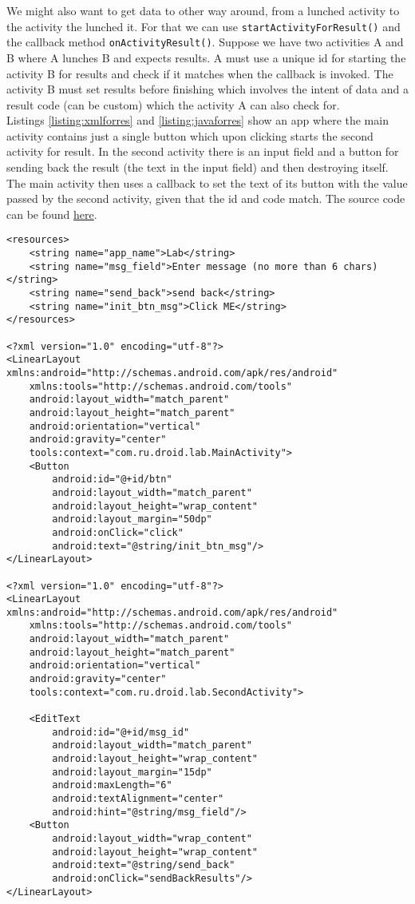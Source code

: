 We might also want to get data to other way around, from a lunched activity to the activity the lunched it. For that we can use \texttt{startActivityForResult()} and the callback method \texttt{onActivityResult()}. Suppose we have two activities A and B where A lunches B and expects results. A must use a unique id for starting the activity B for results and check if it matches when the callback is invoked. The activity B must set results before finishing which involves the intent of data and a result code (can be custom) which the activity A can also check for.\\

Listings \ref{listing:xmlforres} and \ref{listing:javaforres} show an app where the main activity contains just a single button which upon clicking starts the second activity for result. In the second activity there is an input field and a button for sending back the result (the text in the input field) and then destroying itself. The main activity then uses a callback to set the text of its button with the value passed by the second activity, given that the id and code match. The source code can be found \href{https://github.com/JonSteinn/AndroidDevelopment/tree/master/examples/lab3/activityforresult}{here}.

\begin{lstlisting}[style=A_XML, caption={Layout for start activity for result}, label={listing:xmlforres}]
<resources>
    <string name="app_name">Lab</string>
    <string name="msg_field">Enter message (no more than 6 chars)</string>
    <string name="send_back">send back</string>
    <string name="init_btn_msg">Click ME</string>
</resources>

<?xml version="1.0" encoding="utf-8"?>
<LinearLayout xmlns:android="http://schemas.android.com/apk/res/android"
    xmlns:tools="http://schemas.android.com/tools"
    android:layout_width="match_parent"
    android:layout_height="match_parent"
    android:orientation="vertical"
    android:gravity="center"
    tools:context="com.ru.droid.lab.MainActivity">
    <Button
        android:id="@+id/btn"
        android:layout_width="match_parent"
        android:layout_height="wrap_content"
        android:layout_margin="50dp"
        android:onClick="click"
        android:text="@string/init_btn_msg"/>
</LinearLayout>

<?xml version="1.0" encoding="utf-8"?>
<LinearLayout xmlns:android="http://schemas.android.com/apk/res/android"
    xmlns:tools="http://schemas.android.com/tools"
    android:layout_width="match_parent"
    android:layout_height="match_parent"
    android:orientation="vertical"
    android:gravity="center"
    tools:context="com.ru.droid.lab.SecondActivity">

    <EditText
        android:id="@+id/msg_id"
        android:layout_width="match_parent"
        android:layout_height="wrap_content"
        android:layout_margin="15dp"
        android:maxLength="6"
        android:textAlignment="center"
        android:hint="@string/msg_field"/>
    <Button
        android:layout_width="wrap_content"
        android:layout_height="wrap_content"
        android:text="@string/send_back"
        android:onClick="sendBackResults"/>
</LinearLayout>
\end{lstlisting}

